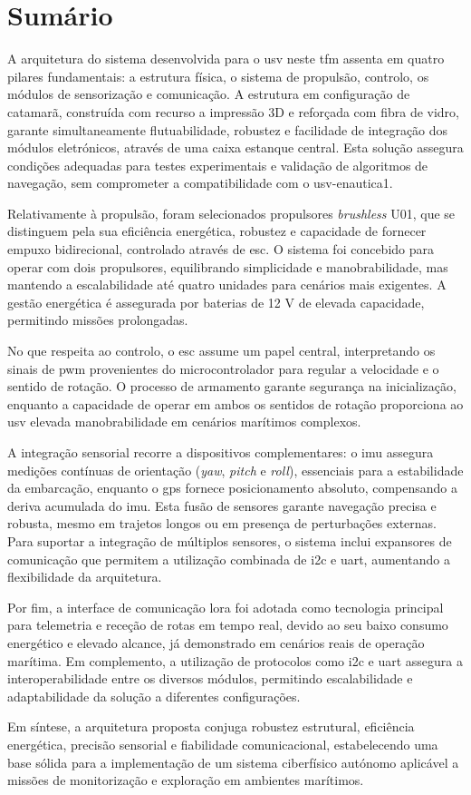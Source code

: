 \section{Sumário}

A arquitetura do sistema desenvolvida para o \gls{usv} neste \gls{tfm} assenta em quatro pilares fundamentais: a estrutura física, o sistema de propulsão, controlo, os módulos de sensorização e comunicação. A estrutura em configuração de catamarã, construída com recurso a impressão 3D e reforçada com fibra de vidro, garante simultaneamente flutuabilidade, robustez e facilidade de integração dos módulos eletrónicos, através de uma caixa estanque central. Esta solução assegura condições adequadas para testes experimentais e validação de algoritmos de navegação, sem comprometer a compatibilidade com o \gls{usv}-enautica1.

Relativamente à propulsão, foram selecionados propulsores \emph{brushless} U01, que se distinguem pela sua eficiência energética, robustez e capacidade de fornecer empuxo bidirecional, controlado através de \gls{esc}. O sistema foi concebido para operar com dois propulsores, equilibrando simplicidade e manobrabilidade, mas mantendo a escalabilidade até quatro unidades para cenários mais exigentes. A gestão energética é assegurada por baterias de 12 V de elevada capacidade, permitindo missões prolongadas.

No que respeita ao controlo, o \gls{esc} assume um papel central, interpretando os sinais de \gls{pwm} provenientes do microcontrolador para regular a velocidade e o sentido de rotação. O processo de armamento garante segurança na inicialização, enquanto a capacidade de operar em ambos os sentidos de rotação proporciona ao \gls{usv} elevada manobrabilidade em cenários marítimos complexos.

A integração sensorial recorre a dispositivos complementares: o \gls{imu} assegura medições contínuas de orientação (\emph{yaw}, \emph{pitch} e \emph{roll}), essenciais para a estabilidade da embarcação, enquanto o \gls{gps} fornece posicionamento absoluto, compensando a deriva acumulada do \gls{imu}. Esta fusão de sensores garante navegação precisa e robusta, mesmo em trajetos longos ou em presença de perturbações externas. Para suportar a integração de múltiplos sensores, o sistema inclui expansores de comunicação que permitem a utilização combinada de \gls{i2c} e \gls{uart}, aumentando a flexibilidade da arquitetura.

Por fim, a interface de comunicação \gls{lora} foi adotada como tecnologia principal para telemetria e receção de rotas em tempo real, devido ao seu baixo consumo energético e elevado alcance, já demonstrado em cenários reais de operação marítima. Em complemento, a utilização de protocolos como \gls{i2c} e \gls{uart} assegura a interoperabilidade entre os diversos módulos, permitindo escalabilidade e adaptabilidade da solução a diferentes configurações.

Em síntese, a arquitetura proposta conjuga robustez estrutural, eficiência energética, precisão sensorial e fiabilidade comunicacional, estabelecendo uma base sólida para a implementação de um sistema ciberfísico autónomo aplicável a missões de monitorização e exploração em ambientes marítimos.
